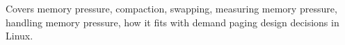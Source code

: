 Covers memory pressure, compaction, swapping, measuring memory pressure,
handling memory pressure, how it fits with demand paging design decisions in
Linux.\\
